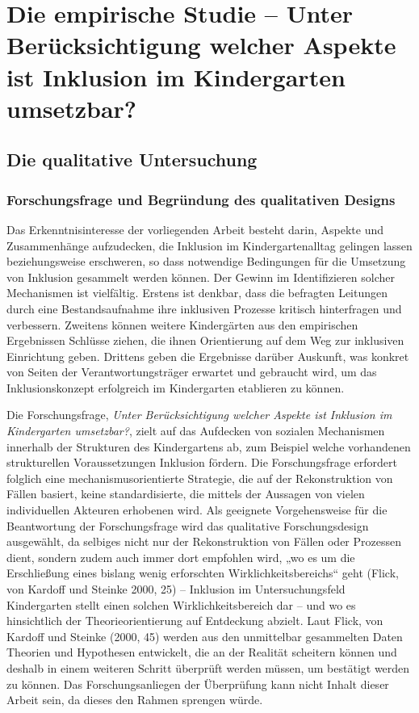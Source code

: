 \part{Die empirische Studie -- Unter Berücksichtigung welcher Aspekte ist Inklusion im Kindergarten umsetzbar?}
\chapter{Die qualitative Untersuchung}
\section{Forschungsfrage und Begründung des qualitativen Designs}
Das Erkenntnisinteresse der vorliegenden Arbeit besteht darin, Aspekte und Zusammenhänge aufzudecken, die Inklusion im Kindergartenalltag gelingen lassen beziehungsweise erschweren, so dass notwendige Bedingungen für die Umsetzung von Inklusion gesammelt werden können. Der Gewinn im Identifizieren solcher Mechanismen ist vielfältig. Erstens ist denkbar, dass die befragten Leitungen durch eine Bestandsaufnahme ihre inklusiven Prozesse kritisch hinterfragen und verbessern. Zweitens können weitere Kindergärten aus den empirischen Ergebnissen Schlüsse ziehen, die ihnen Orientierung auf dem Weg zur inklusiven Einrichtung geben. Drittens geben die Ergebnisse darüber Auskunft, was konkret von Seiten der Verantwortungsträger erwartet und gebraucht wird, um das Inklusionskonzept erfolgreich im Kindergarten etablieren zu können.

Die Forschungsfrage, \emph{Unter Berücksichtigung welcher Aspekte ist Inklusion im Kindergarten umsetzbar?}, zielt auf das Aufdecken von sozialen Mechanismen innerhalb der Strukturen des Kindergartens ab, zum Beispiel welche vorhandenen strukturellen Voraussetzungen Inklusion fördern. 
Die Forschungsfrage erfordert folglich eine mechanismusorientierte Strategie, die auf der Rekonstruktion von Fällen basiert, keine  standardisierte, die mittels der Aussagen von vielen individuellen Akteuren erhobenen wird. Als geeignete Vorgehensweise für die Beantwortung der Forschungsfrage wird das  
qualitative Forschungsdesign ausgewählt, da selbiges nicht nur der Rekonstruktion von Fällen oder Prozessen dient, sondern zudem auch immer dort empfohlen wird, „wo es um die Erschließung eines bislang wenig erforschten Wirklichkeitsbereichs“ geht (Flick, von Kardoff und Steinke 2000, 25) -- Inklusion im Untersuchungsfeld Kindergarten stellt einen solchen Wirklichkeitsbereich dar -- und wo es hinsichtlich der Theorieorientierung auf Entdeckung abzielt.
Laut Flick, von Kardoff und Steinke (2000, 45) werden aus den unmittelbar gesammelten Daten Theorien und Hypothesen entwickelt, die  an der Realität scheitern können und deshalb in einem weiteren Schritt überprüft werden müssen, um bestätigt werden zu können. Das Forschungsanliegen der Überprüfung kann nicht Inhalt dieser Arbeit sein, da dieses den Rahmen sprengen würde.  

